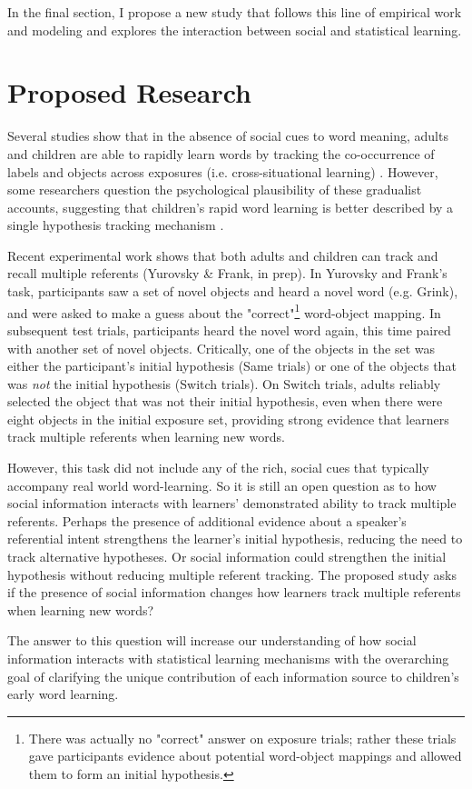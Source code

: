 \documentclass[man]{apa2}
\begin{document}
In the final section, I propose a new study that follows this line of empirical work and modeling\cite{johnson2012exploiting,frank2009using,yu2007unified,hollich2000breaking} and explores the interaction between social and statistical learning.

\section{Proposed Research}

Several studies show that in the absence of social cues to word meaning, adults and children are able to rapidly learn words by tracking the co-occurrence of labels and objects across exposures (i.e. cross-situational learning) \cite{smith2008infants,vouloumanos2008fine}. However, some researchers question the psychological plausibility of these gradualist accounts, suggesting that children's rapid word learning is better described by a single hypothesis tracking mechanism \cite{trueswell2013propose,medina2011words}. 

Recent experimental work shows that both adults and children can track and recall 
multiple referents (Yurovsky & Frank, in prep). In Yurovsky and Frank's task, participants saw a set of novel objects and heard a novel word (e.g. Grink), and were asked to make a guess about the "correct"\footnote{There was actually no "correct" answer on exposure trials; rather these trials gave participants evidence about potential word-object mappings and allowed them to form an initial hypothesis.} word-object mapping. In subsequent test trials, participants heard the novel word again, this time paired with another set of novel objects. Critically, one of the objects in the set was either the participant's initial hypothesis (Same trials) or one of the objects that was \emph{not} the initial hypothesis (Switch trials). On Switch trials, adults reliably selected the object that was not their initial hypothesis, even when there were eight objects in the initial exposure set, providing strong evidence that learners track multiple referents when learning new words. 

However, this task did not include any of the rich, social cues that typically accompany real world 
word-learning. So it is still an open question as to how social information interacts with learners' 
demonstrated ability to track multiple referents. Perhaps the presence of additional evidence about 
a speaker's referential intent strengthens the learner's initial hypothesis, reducing the need to track 
alternative hypotheses. Or social information could strengthen the initial hypothesis 
without reducing multiple referent tracking. The proposed study asks if the presence of social information changes how learners track multiple referents when learning new words?

The answer to this question will increase our understanding of how social information interacts with statistical learning mechanisms with the overarching goal of clarifying the unique contribution of each information source to children's early word learning. 



\end{document}
